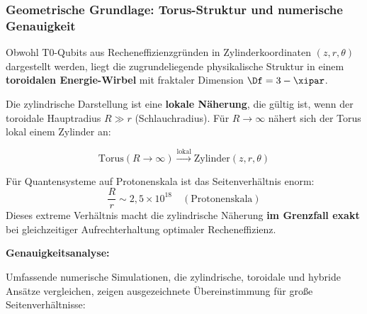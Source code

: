 \subsubsection{Geometrische Grundlage: Torus-Struktur und numerische Genauigkeit}
\label{sec:torus_geometry_corrected}

Obwohl T0-Qubits aus Recheneffizienzgründen in Zylinderkoordinaten $(z,r,\theta)$ 
dargestellt werden, liegt die zugrundeliegende physikalische Struktur in einem 
\textbf{toroidalen Energie-Wirbel} mit fraktaler Dimension $\Df = 3 - \xipar$.

Die zylindrische Darstellung ist eine \textbf{lokale Näherung}, die gültig ist, 
wenn der toroidale Hauptradius $R \gg r$ (Schlauchradius). Für $R \to \infty$ 
nähert sich der Torus lokal einem Zylinder an:

\[
\text{Torus}(R \to \infty) \xrightarrow{\text{lokal}} \text{Zylinder}(z,r,\theta)
\]

Für Quantensysteme auf Protonenskala ist das Seitenverhältnis enorm:
\[
\frac{R}{r} \sim 2,\!5 \times 10^{18} \quad (\text{Protonenskala})
\]
Dieses extreme Verhältnis macht die zylindrische Näherung \textbf{im Grenzfall exakt} 
bei gleichzeitiger Aufrechterhaltung optimaler Recheneffizienz.

\textbf{Genauigkeitsanalyse:}

Umfassende numerische Simulationen, die zylindrische, toroidale und hybride 
Ansätze vergleichen, zeigen ausgezeichnete Übereinstimmung für große Seitenverhältnisse:

\begin{table}[h]
	\centering
	\caption{Vergleich des CHSH-Parameters: 73-Qubit-System}
	\label{tab:chsh_methods_comparison}
\end{table}

